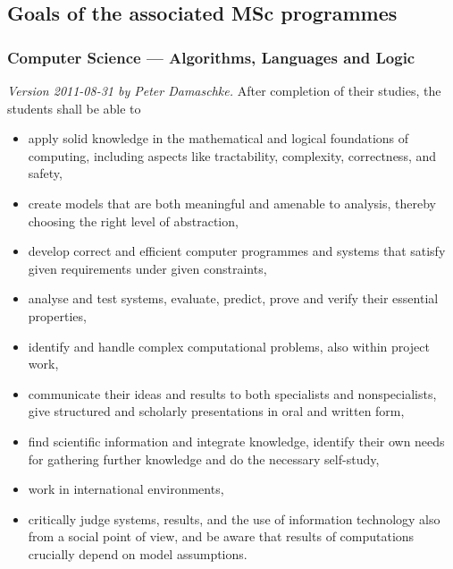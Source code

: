 \documentclass[twocolumn]{article}
\newcommand{\meta}[1]{{\small \emph{#1}}}
\begin{document}



\subsection{Goals of the associated MSc programmes}
\subsubsection{Computer Science --- Algorithms, Languages and Logic}
\meta{Version 2011-08-31 by Peter Damaschke.}
After completion of their studies, the students shall be able to
\begin{itemize}
\item apply solid knowledge in the mathematical and logical
  foundations of computing, including aspects like tractability,
  complexity, correctness, and safety,
\item create models that are both meaningful and amenable to analysis,
  thereby choosing the right level of abstraction,
\item develop correct and efficient computer programmes and systems
  that satisfy given requirements under given constraints,
\item analyse and test systems, evaluate, predict, prove and verify
  their essential properties,
\item identify and handle complex computational problems, also within
  project work, 
\item communicate their ideas and results to both specialists and
  nonspecialists, give structured and scholarly presentations in oral
  and written form,
\item find scientific information and integrate knowledge, identify
  their own needs for gathering further knowledge and do the necessary
  self-study,
\item work in international environments,
\item critically judge systems, results, and the use of information
  technology also from a social point of view, and be aware that
  results of computations crucially depend on model assumptions.
\end{itemize}
\end{document}
